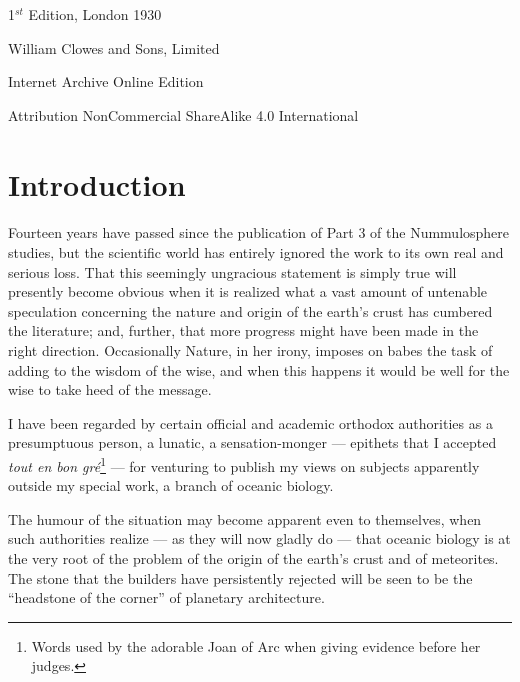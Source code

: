 \documentclass[a4paper, 12pt, oneside]{article}
\begin{document}
\begin{titlepage}
	
		
	\vspace*{\fill}%
	
	1$^{st}$ Edition, London 1930 %
	
	{\small William Clowes and Sons, Limited } %

	\vspace{1\baselineskip} %

    Internet Archive Online Edition  %
	
	{\small Attribution NonCommercial ShareAlike 4.0 International } %
\end{titlepage}
\setlength{\parskip}{1mm plus1mm minus1mm}
\setcounter{tocdepth}{3}
\setcounter{secnumdepth}{3}
\tableofcontents
\clearpage
\listoffigures{}
\clearpage
\section*{Introduction}
\paragraph{}
Fourteen years have passed since the publication of Part 3 of the Nummulosphere studies, but the scientific world has entirely ignored the work to its own real and serious loss. That this seemingly ungracious statement is simply true will presently become obvious when it is realized what a vast amount of untenable speculation concerning the nature and origin of the earth's crust has cumbered the literature; and, further, that more progress might have been made in the right direction. Occasionally Nature, in her irony, imposes on babes the task of adding to the wisdom of the wise, and when this happens it would be well for the wise to take heed of the message.

I have been regarded by certain official and academic orthodox authorities as a presumptuous person, a lunatic, a sensation-monger --- epithets that I accepted \emph{tout en bon gré}\footnote{Words used by the adorable Joan of Arc when giving evidence before her judges.} --- for venturing to publish my views on subjects apparently outside my special work, a branch of oceanic biology.

The humour of the situation may become apparent even to themselves, when such authorities realize --- as they will now gladly do --- that oceanic biology is at the very root of the problem of the origin of the earth's crust and of meteorites. The stone that the builders have persistently rejected will be seen to be the ``headstone of the corner'' of planetary architecture.
\end{document}
